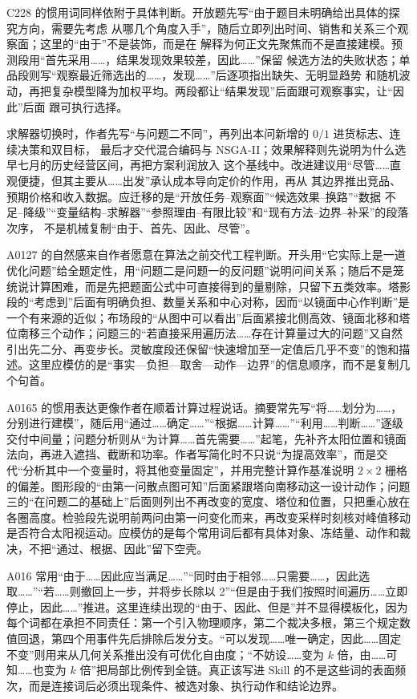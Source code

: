 C228 的惯用词同样依附于具体判断。开放题先写“由于题目未明确给出具体的探究方向，需要先考虑
从哪几个角度入手”，随后立即列出时间、销售和关系三个观察面；这里的“由于”不是装饰，而是在
解释为何正文先聚焦而不是直接建模。预测段用“首先采用……，结果发现效果较差，因此……”保留
候选方法的失败状态；单品段则写“观察最近筛选出的……，发现……”后逐项指出缺失、无明显趋势
和随机波动，再把复杂模型降为加权平均。两段都让“结果发现”后面跟可观察事实，让“因此”后面
跟可执行选择。

求解器切换时，作者先写“与问题二不同”，再列出本问新增的 $0/1$ 进货标志、连续决策和双目标，
最后才交代混合编码与 NSGA-II；效果解释则先说明为什么选早七月的历史经营区间，再把方案利润放入
这个基线中。改进建议用“尽管……直观便捷，但其主要从……出发”承认成本导向定价的作用，再从
其边界推出竞品、预期价格和收入数据。应迁移的是“开放任务--观察面”“候选效果--换路”“数据
不足--降级”“变量结构--求解器”“参照理由--有限比较”和“现有方法--边界--补采”的段落次序，
不是机械复制“由于、首先、因此、尽管”。

A0127 的自然感来自作者愿意在算法之前交代工程判断。开头用“它实际上是一道优化问题”给全题定性，用“问题二是问题一的反问题”说明问间关系；随后不是笼统说计算困难，而是先把题面公式中可直接得到的量剔除，只留下五类效率。塔影段的“考虑到”后面有明确负担、数量关系和中心对称，因而“以镜面中心作判断”是一个有来源的近似；布场段的“从图中可以看出”后面紧接北侧高效、镜面北移和塔位南移三个动作；问题三的“若直接采用遍历法……存在计算量过大的问题”又自然引出先二分、再变步长。灵敏度段还保留“快速增加至一定值后几乎不变”的饱和描述。这里应模仿的是“事实—负担—取舍—动作—边界”的信息顺序，而不是复制几个句首。

A0165 的惯用表达更像作者在顺着计算过程说话。摘要常先写“将……划分为……，分别进行建模”，随后用“通过……确定……”“根据……计算……”“利用……判断……”逐级交付中间量；问题分析则从“为计算……首先需要……”起笔，先补齐太阳位置和镜面法向，再进入遮挡、截断和功率。作者写简化时不只说“为提高效率”，而是交代“分析其中一个变量时，将其他变量固定”，并用完整计算作基准说明 $2\times2$ 栅格的偏差。图形段的“由第一问散点图可知”后面紧跟塔向南移动这一设计动作；问题三的“在问题二的基础上”后面则列出不再改变的宽度、塔位和位置，只把重心放在各圈高度。检验段先说明前两问由第一问变化而来，再改变采样时刻核对峰值移动是否符合太阳视运动。应模仿的是每个常用词后都有具体对象、冻结量、动作和裁决，不把“通过、根据、因此”留下空壳。

A016 常用“由于……因此应当满足……”“同时由于相邻……只需要……，因此选取……”“若……则撤回上一步，并将步长除以 2”“但是由于我们按照时间遍历……立即停止，因此……”推进。这里连续出现的“由于、因此、但是”并不显得模板化，因为每个词都在承担不同责任：第一个引入物理顺序，第二个裁决多根，第三个规定数值回退，第四个用事件先后排除后发分支。“可以发现……唯一确定，因此……固定不变”则用来从几何关系推出没有可优化自由度；“不妨设……变为 $k$ 倍，由……可知……也变为 $k$ 倍”把局部比例传到全链。真正该写进 Skill 的不是这些词的表面频次，而是连接词后必须出现条件、被选对象、执行动作和结论边界。


